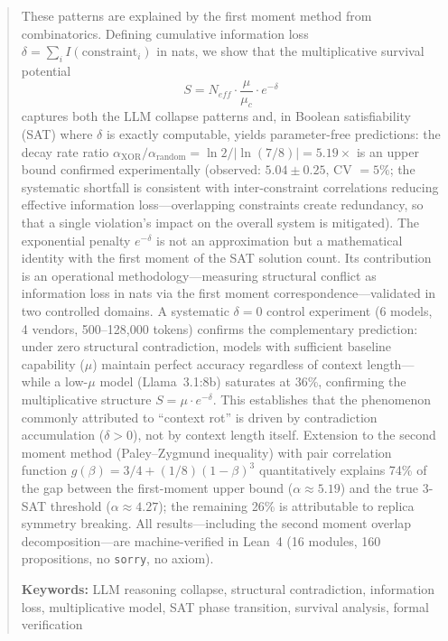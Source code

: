 \documentclass[11pt,a4paper]{article}
\begin{document}
\begin{abstract}
These patterns are explained by the first moment method from combinatorics. Defining cumulative information loss $\delta = \sum_i I(\text{constraint}_i)$ in nats, we show that the multiplicative survival potential
\[
S = N_{eff} \cdot \frac{\mu}{\mu_c} \cdot e^{-\delta}
\]
captures both the LLM collapse patterns and, in Boolean satisfiability (SAT) where $\delta$ is exactly computable, yields parameter-free predictions: the decay rate ratio $\alpha_{\text{XOR}}/\alpha_{\text{random}} = \ln 2 / |\ln(7/8)| = 5.19\times$ is an upper bound confirmed experimentally (observed: $5.04 \pm 0.25$, CV $= 5\%$; the systematic shortfall is consistent with inter-constraint correlations reducing effective information loss---overlapping constraints create redundancy, so that a single violation's impact on the overall system is mitigated). The exponential penalty $e^{-\delta}$ is not an approximation but a mathematical identity with the first moment of the SAT solution count. Its contribution is an operational methodology---measuring structural conflict as information loss in nats via the first moment correspondence---validated in two controlled domains. A systematic $\delta = 0$ control experiment (6 models, 4 vendors, 500--128{,}000 tokens) confirms the complementary prediction: under zero structural contradiction, models with sufficient baseline capability ($\mu$) maintain perfect accuracy regardless of context length---while a low-$\mu$ model (Llama~3.1:8b) saturates at 36\%, confirming the multiplicative structure $S = \mu \cdot e^{-\delta}$. This establishes that the phenomenon commonly attributed to ``context rot'' is driven by contradiction accumulation ($\delta > 0$), not by context length itself. Extension to the second moment method (Paley--Zygmund inequality) with pair correlation function $g(\beta) = 3/4 + (1/8)(1-\beta)^3$ quantitatively explains 74\% of the gap between the first-moment upper bound ($\alpha \approx 5.19$) and the true 3-SAT threshold ($\alpha \approx 4.27$); the remaining 26\% is attributable to replica symmetry breaking. All results---including the second moment overlap decomposition---are machine-verified in Lean~4 (16 modules, 160 propositions, no \texttt{sorry}, no axiom).

\medskip
\noindent\textbf{Keywords:} LLM reasoning collapse, structural contradiction, information loss, multiplicative model, SAT phase transition, survival analysis, formal verification
\end{abstract}

\end{document}
